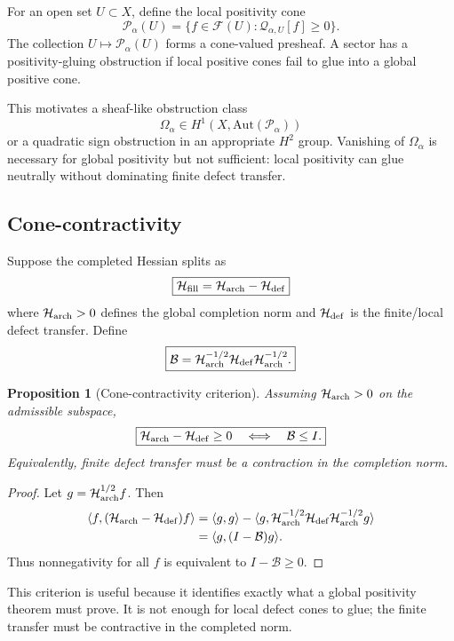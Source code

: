 \documentclass[11pt]{article}
\newtheorem{proposition}[theorem]{Proposition}
\newcommand{\Hess}{\mathcal H}
\newcommand{\Q}{\mathcal Q}
\newcommand{\Pcone}{\mathcal P}
\begin{document}
For an open set $U\subset X$, define the local positivity cone
\[
\boxed{
\Pcone_\alpha(U)=\{f\in\mathcal F(U):\Q_{\alpha,U}[f]\ge0\}.
}
\]
The collection $U\mapsto\Pcone_\alpha(U)$ forms a cone-valued presheaf. A sector has a positivity-gluing obstruction if local positive cones fail to glue into a global positive cone.

This motivates a sheaf-like obstruction class
\[
\boxed{
        \Omega_\alpha\in H^1(X,\mathrm{Aut}(\Pcone_\alpha))
}
\]
or a quadratic sign obstruction in an appropriate $H^2$ group. Vanishing of $\Omega_\alpha$ is necessary for global positivity but not sufficient: local positivity can glue neutrally without dominating finite defect transfer.

\subsection{Cone-contractivity}

Suppose the completed Hessian splits as
\[
\boxed{
        \Hess_{\rm fill}=\Hess_{\rm arch}-\Hess_{\rm def}
}
\]
where $\Hess_{\rm arch}>0$ defines the global completion norm and $\Hess_{\rm def}$ is the finite/local defect transfer. Define
\[
\boxed{
        \mathcal B=\Hess_{\rm arch}^{-1/2}\Hess_{\rm def}\Hess_{\rm arch}^{-1/2}.
}
\]

\begin{proposition}[Cone-contractivity criterion]
Assuming $\Hess_{\rm arch}>0$ on the admissible subspace,
\[
\boxed{
        \Hess_{\rm arch}-\Hess_{\rm def}\ge0
        \quad\Longleftrightarrow\quad
        \mathcal B\le I.
}
\]
Equivalently, finite defect transfer must be a contraction in the completion norm.
\end{proposition}

\begin{proof}
Let $g=\Hess_{\rm arch}^{1/2}f$. Then
\[
\begin{aligned}
\langle f,(\Hess_{\rm arch}-\Hess_{\rm def})f\rangle
&=\langle g,g\rangle-\langle g,\Hess_{\rm arch}^{-1/2}\Hess_{\rm def}\Hess_{\rm arch}^{-1/2}g\rangle\\
&=\langle g,(I-\mathcal B)g\rangle.
\end{aligned}
\]
Thus nonnegativity for all $f$ is equivalent to $I-\mathcal B\ge0$.
\end{proof}

This criterion is useful because it identifies exactly what a global positivity theorem must prove. It is not enough for local defect cones to glue; the finite transfer must be contractive in the completed norm.
\end{document}
